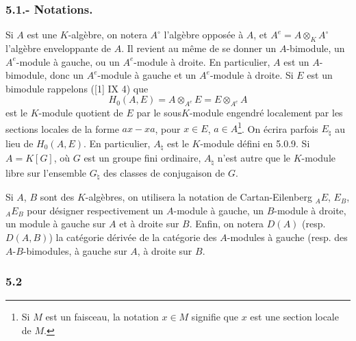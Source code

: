 \subsubsection*{5.1.- Notations.}

Si $A$ est une $K$-algèbre, on notera $A^\circ$ l'algèbre opposée à $A$, et $A^e=A\otimes_KA^\circ$ l'algèbre enveloppante de $A$. Il revient au même de se donner un $A$-bimodule, un $A^e$-module à gauche, ou un $A^e$-module à droite. En particulier, $A$ est un $A$-bimodule, donc un $A^e$-module à gauche et un $A^e$-module à droite. Si $E$ est un bimodule rappelons ([1] IX 4) que
\[
H_0(A,E)=A\otimes_{A^e}E=E\otimes_{A^e}A
\]
est le $K$-module quotient de $E$ par le sous$K$-module engendré localement par les sections locales de la forme $ax-xa$, pour $x\in E$, $a\in A$\footnote{Si $M$ est un faisceau, la notation $x\in M$ signifie que $x$ est une section locale de $M$.}. On écrira parfois $E_\natural$ au lieu de $H_0(A,E)$. En particulier, $A_\natural$ est le $K$-module défini en 5.0.9. Si $A=K[G]$, où $G$ est un groupe fini ordinaire, $A_\natural$ n'est autre que le $K$-module libre sur l'ensemble $G_\natural$ des classes de conjugaison de $G$.

Si $A$, $B$ sont des $K$-algèbres, on utilisera la notation de Cartan-Eilenberg ${}_AE$, $E_B$, ${}_AE_B$ pour désigner respectivement un $A$-module à gauche, un $B$-module à droite, un module à gauche sur $A$ et à droite sur $B$. Enfin, on notera $D(A)$ (resp. $D(A,B)$) la catégorie dérivée de la catégorie des $A$-modules à gauche (resp. des $A$-$B$-bimodules, à gauche sur $A$, à droite sur $B$.

\subsubsection*{5.2}

